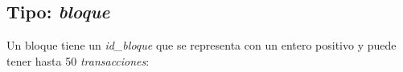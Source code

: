 \documentclass[10pt,a4paper]{article}
\begin{document}
    \subsection{Tipo: \textit{bloque}}
    Un bloque tiene un \textit{id\_bloque} que se representa con un entero positivo y puede tener hasta 50 \textit{transacciones}:

    \vspace{0.3cm}
    \noindent
    \vspace{0.1cm}

    \newpage
\end{document}
